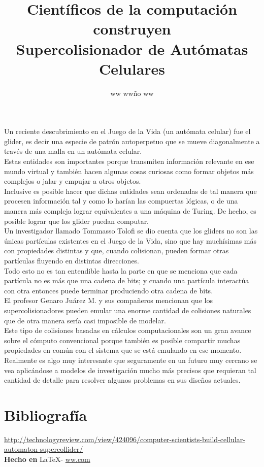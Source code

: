 \documentclass{article}
\title{Científicos de la computación construyen \\Supercolisionador de Autómatas Celulares}
\author{ww ww\~no ww}
\date{} %
\begin{document}
	\maketitle
	\normalsize{
Un reciente descubrimiento en el Juego de la Vida (un autómata celular) fue el glider, es decir una especie de patrón autoperpetuo que se mueve diagonalmente a través de una malla en un autómata celular.
\\

Estas entidades son importantes porque transmiten información relevante en ese mundo virtual y también hacen algunas cosas curiosas como formar objetos más complejos o jalar y empujar a otros objetos.
\\

Inclusive es posible hacer que dichas entidades sean ordenadas de tal manera que procesen información tal y como lo harían las compuertas lógicas, o de una manera más compleja lograr equivalentes a una máquina de Turing. De hecho, es posible lograr que los glider puedan computar.
\\

Un investigador llamado Tommasso Tolofi se dio cuenta que los gliders no son las únicas partículas existentes en el Juego de la Vida, sino que hay muchísimas más con propiedades distintas y que, cuando colisionan, pueden formar otras partículas fluyendo en distintas direcciones.
\\

Todo esto no es tan entendible hasta la parte en que se menciona que cada partícula no es más que una cadena de bits; y cuando una partícula interactúa con otra entonces puede terminar produciendo otra cadena de bits.
\\

El profesor Genaro Juárez M. y sus compañeros mencionan que los supercolisionadores pueden emular una enorme cantidad de colisiones naturales que de otra manera sería casi imposible de modelar.
\\

Este tipo de colisiones basadas en cálculos computacionales son un gran avance sobre el cómputo convencional porque también es posible compartir muchas propiedades en común con el sistema que se está emulando en ese momento.
\\

Realmente es algo muy interesante que seguramente en un futuro muy cercano se vea aplicándose a modelos de investigación mucho más precisos que requieran tal cantidad de detalle para resolver algunos problemas en sus diseños actuales.
}

\vspace{2cm}

\section*{Bibliograf\'ia}

\noindent \url{http://technologyreview.com/view/424096/computer-scientists-build-cellular-automaton-supercollider/}
\\

\large{\hfill \textbf{Hecho en } \LaTeX - \url{ww.com}}
\end{document}
